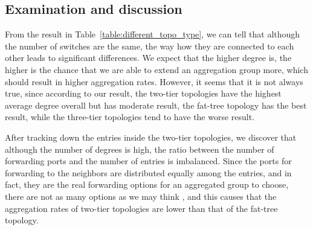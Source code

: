 \subsection{Examination and discussion}
\label{examination_and_discussion}
From the result in Table~\ref{table:different_topo_type}, we can tell that although the number of switches are the same, the way how they are connected to each other leads to significant differences. We expect that the higher degree is, the higher is the chance that we are able to extend an aggregation group more, which should result in higher aggregation rates. However, it seems that it is not always true, since according to our result, the two-tier topologies have the highest average degree overall but has moderate result, the fat-tree topology has the best result, while the three-tier topologies tend to have the worse result. 

After tracking down the entries inside the two-tier topologies, we discover that although the number of degrees is high, the ratio between the number of forwarding ports and the number of entries is imbalanced. Since the ports for forwarding to the neighbors are distributed equally among the entries, and in fact, they are the real forwarding options for an aggregated group to choose, there are not as many options as we may think , and this causes that the aggregation rates of two-tier topologies are lower than that of the fat-tree topology. 

